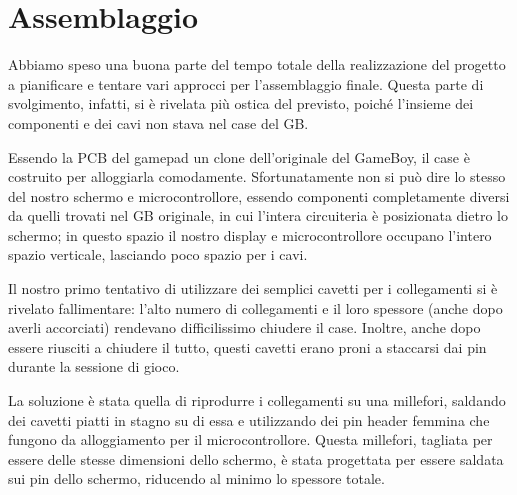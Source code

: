 \documentclass[hidelinks,12pt]{article}
\begin{document}
\section{Assemblaggio}
Abbiamo speso una buona parte del tempo totale della realizzazione del progetto
a pianificare e tentare vari approcci per l'assemblaggio finale. Questa parte di
svolgimento, infatti, si è rivelata più ostica del previsto, poiché l'insieme
dei componenti e dei cavi non stava nel case del GB.

Essendo la PCB del gamepad un clone dell'originale del GameBoy, il case è
costruito per alloggiarla comodamente. Sfortunatamente non si può dire lo stesso
del nostro schermo e microcontrollore, essendo componenti completamente diversi
da quelli trovati nel GB originale, in cui l'intera circuiteria è posizionata
dietro lo schermo; in questo spazio il nostro display e microcontrollore
occupano l'intero spazio verticale, lasciando poco spazio per i cavi.

Il nostro primo tentativo di utilizzare dei semplici cavetti per i collegamenti
si è rivelato fallimentare: l'alto numero di collegamenti e il loro spessore
(anche dopo averli accorciati) rendevano difficilissimo chiudere il case.
Inoltre, anche dopo essere riusciti a chiudere il tutto, questi cavetti erano
proni a staccarsi dai pin durante la sessione di gioco.

La soluzione è stata quella di riprodurre i collegamenti su una millefori,
saldando dei cavetti piatti in stagno su di essa e utilizzando dei pin header
femmina che fungono da alloggiamento per il microcontrollore.
Questa millefori, tagliata per essere delle stesse dimensioni dello schermo, è
stata progettata per essere saldata sui pin dello schermo, riducendo al minimo
lo spessore totale.
\end{document}

